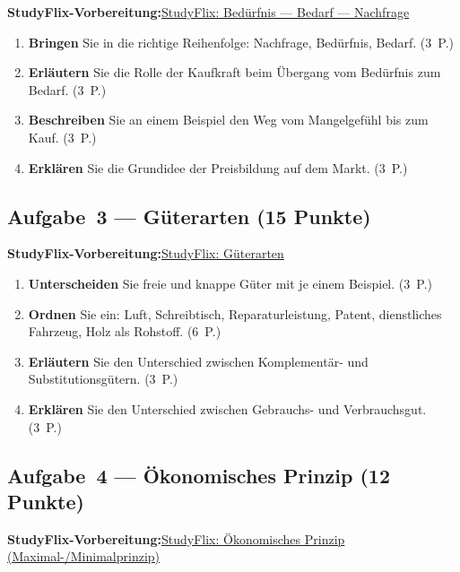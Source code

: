 \documentclass[11pt, a4paper]{article}
\begin{document}
\noindent\textbf{\color{bfwAccent}StudyFlix-Vorbereitung:}\enspace \href{https://studyflix.de/wirtschaft/beduerfnis-bedarf-nachfrage-4827}{StudyFlix: Bedürfnis --- Bedarf --- Nachfrage}

\medskip
\begin{enumerate}[label=(\alph*)]
  \item \textbf{Bringen} Sie in die richtige Reihenfolge: Nachfrage, Bedürfnis, Bedarf. \hfill (3~P.)
  \item \textbf{Erläutern} Sie die Rolle der Kaufkraft beim Übergang vom Bedürfnis zum Bedarf. \hfill (3~P.)
  \item \textbf{Beschreiben} Sie an einem Beispiel den Weg vom Mangelgefühl bis zum Kauf. \hfill (3~P.)
  \item \textbf{Erklären} Sie die Grundidee der Preisbildung auf dem Markt. \hfill (3~P.)
\end{enumerate}

\subsection*{Aufgabe~3 --- Güterarten (15 Punkte)}

\noindent\textbf{\color{bfwAccent}StudyFlix-Vorbereitung:}\enspace \href{https://studyflix.de/wirtschaft/gueterarten-3103}{StudyFlix: Güterarten}

\medskip
\begin{enumerate}[label=(\alph*)]
  \item \textbf{Unterscheiden} Sie freie und knappe Güter mit je einem Beispiel. \hfill (3~P.)
  \item \textbf{Ordnen} Sie ein: Luft, Schreibtisch, Reparaturleistung, Patent, dienstliches Fahrzeug, Holz als Rohstoff. \hfill (6~P.)
  \item \textbf{Erläutern} Sie den Unterschied zwischen Komplementär- und Substitutionsgütern. \hfill (3~P.)
  \item \textbf{Erklären} Sie den Unterschied zwischen Gebrauchs- und Verbrauchsgut. \hfill (3~P.)
\end{enumerate}

\subsection*{Aufgabe~4 --- Ökonomisches Prinzip (12 Punkte)}

\noindent\textbf{\color{bfwAccent}StudyFlix-Vorbereitung:}\enspace \href{https://studyflix.de/wirtschaft/okonomisches-prinzip-1613}{StudyFlix: Ökonomisches Prinzip (Maximal-/Minimalprinzip)}
\end{document}

